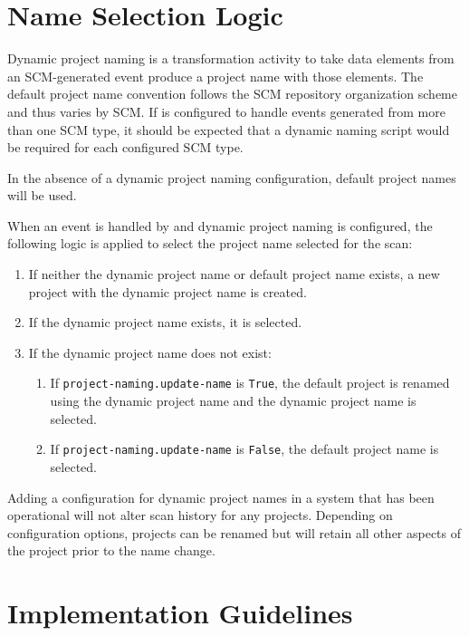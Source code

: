 


\section{Name Selection Logic}

Dynamic project naming is a transformation activity to take data elements from an SCM-generated event produce
a project name with those elements.  The default project name convention follows the SCM repository organization
scheme and thus varies by SCM.  If \cxoneflow is configured to handle events generated from more than one SCM type,
it should be expected that a dynamic naming script would be required for each configured SCM type.

In the absence of a dynamic project naming configuration, default project names will be used.

When an event is handled by \cxoneflow and dynamic project naming is configured, the following logic is applied
to select the project name selected for the scan:

\begin{enumerate}
  \item If neither the dynamic project name or default project name exists, a new project with the dynamic project name is created.
  \item If the dynamic project name exists, it is selected.
  \item If the dynamic project name does not exist:
  \begin{enumerate}
    \item If \texttt{project-naming.update-name} is \texttt{True}, the default project is renamed using the dynamic project name
    and the dynamic project name is selected.
    \item If \texttt{project-naming.update-name} is \texttt{False}, the default project name is selected.
  \end{enumerate}
\end{enumerate}

Adding a configuration for dynamic project names in a system that has been operational will not alter scan history
for any projects.  Depending on configuration options, projects can be renamed but will retain all other aspects
of the project prior to the name change.


\section{Implementation Guidelines}

